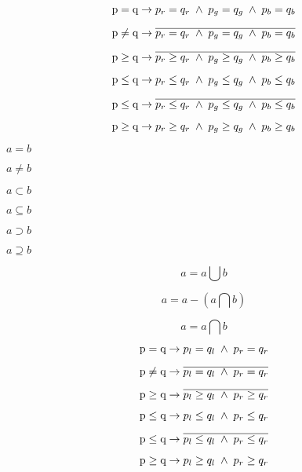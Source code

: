 \documentclass{article}
\begin{document}
\[ \mbox{\boldmath p} = \mbox{\boldmath q} \rightarrow p_r = q_r \; \wedge \; p_g = q_g \; \wedge \; p_b = q_b \]
\pagebreak

\[ \mbox{\boldmath p} \neq \mbox{\boldmath q} \rightarrow \overline{ p_r = q_r \; \wedge \; p_g = q_g \; \wedge \; p_b = q_b } \]
\pagebreak

\[ \mbox{\boldmath p} \ge \mbox{\boldmath q} \rightarrow \overline{ p_r \ge q_r \; \wedge \; p_g \ge q_g \; \wedge \; p_b \ge q_b } \]
\pagebreak

\[ \mbox{\boldmath p} \le \mbox{\boldmath q} \rightarrow p_r \le q_r \; \wedge \; p_g \le q_g \; \wedge \; p_b \le q_b \]
\pagebreak

\[ \mbox{\boldmath p} \le \mbox{\boldmath q} \rightarrow \overline{ p_r \le q_r \; \wedge \; p_g \le q_g \; \wedge \; p_b \le q_b } \]
\pagebreak

\[ \mbox{\boldmath p} \ge \mbox{\boldmath q} \rightarrow p_r \ge q_r \; \wedge \; p_g \ge q_g \; \wedge \; p_b \ge q_b \]
\pagebreak

$ a = b $
\pagebreak

$ a \neq b $
\pagebreak

$ a \subset b $
\pagebreak

$ a \subseteq b $
\pagebreak

$ a \supset b $
\pagebreak

$ a \supseteq b $
\pagebreak

\[ a = a \bigcup b \]
\pagebreak

\[ a = a - \left( a \bigcap b \right) \]
\pagebreak

\[ a = a \bigcap b \]
\pagebreak

\[ \mbox{\boldmath p} = \mbox{\boldmath q} \rightarrow p_l = q_l \; \wedge \; p_r = q_r \]
\pagebreak

\[ \mbox{\boldmath p} \neq \mbox{\boldmath q} \rightarrow \overline{ p_l = q_l \; \wedge \; p_r = q_r } \]
\pagebreak

\[ \mbox{\boldmath p} \ge \mbox{\boldmath q} \rightarrow \overline{ p_l \ge q_l \; \wedge \; p_r \ge q_r } \]
\pagebreak

\[ \mbox{\boldmath p} \le \mbox{\boldmath q} \rightarrow p_l \le q_l \; \wedge \; p_r \le q_r \]
\pagebreak

\[ \mbox{\boldmath p} \le \mbox{\boldmath q} \rightarrow \overline{ p_l \le q_l \; \wedge \; p_r \le q_r } \]
\pagebreak

\[ \mbox{\boldmath p} \ge \mbox{\boldmath q} \rightarrow p_l \ge q_l \; \wedge \; p_r \ge q_r \]
\pagebreak
\end{document}
